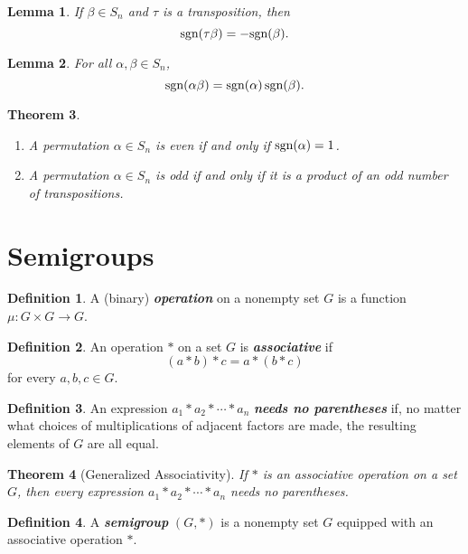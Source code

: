 \documentclass[12pt]{report}
\newtheorem{theorem}{Theorem}[chapter]
\newtheorem{lemma}[theorem]{Lemma}
\theoremstyle{definition}
\newtheorem*{definition}{Definition}
\newcommand{\term}[1]{\textbf{\textit{#1}}}
\begin{document}
\begin{lemma}
	If $\beta\in S_n$ and $\tau$ is a transposition, then
	\[ \textnormal{sgn}(\tau\beta) = -\textnormal{sgn}(\beta). \]
\end{lemma}

\begin{lemma}
	For all $\alpha, \beta\in S_n$,
	\[ \textnormal{sgn}(\alpha\beta) = \textnormal{sgn}(\alpha)\,\textnormal{sgn}(\beta). \]
\end{lemma}

\begin{theorem}
	\quad
	\begin{enumerate}
		\item A permutation $\alpha\in S_n$ is even if and only if $\textnormal{sgn}(\alpha)=1$.
		\item A permutation $\alpha\in S_n$ is odd if and only if it is a product of an odd number of transpositions.
	\end{enumerate}
\end{theorem}

\section{Semigroups}
\begin{definition}
	A (binary) \term{operation} on a nonempty set $G$ is a function $\mu:G\times G\to G$.
\end{definition}

\begin{definition}
	An operation $\ast$ on a set $G$ is \term{associative} if \[(a\ast b)\ast c=a\ast(b\ast c) \] for every $a, b, c\in G$.
\end{definition}

\begin{definition}
	An expression $a_1\ast a_2\ast\cdots\ast a_n$ \term{needs no parentheses} if, no matter what choices of multiplications of adjacent factors are made, the resulting elements of $G$ are all equal.
\end{definition}

\begin{theorem}[Generalized Associativity]
	If $\ast$ is an associative operation on a set $G$, then every expression $a_1\ast a_2\ast\cdots\ast a_n$ needs no parentheses.
\end{theorem}

\begin{definition}
	A \term{semigroup} $(G,\ast)$ is a nonempty set $G$ equipped with an associative operation $\ast$.
\end{definition}
\end{document}
